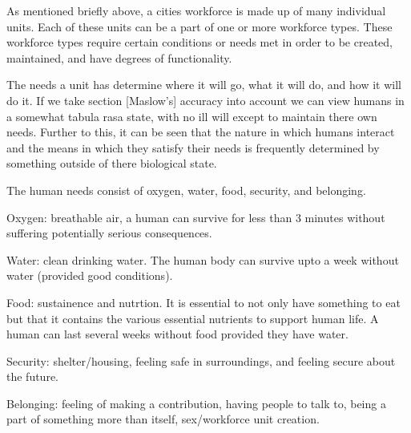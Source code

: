 





As mentioned briefly above, a cities workforce is made up of many individual units. Each of these units can be a part of one or more workforce types. These workforce types require certain conditions or needs met in order to be created, maintained, and have degrees of functionality. 

The needs a unit has determine where it will go, what it will do, and how it will do it. If we take section [Maslow's] accuracy into account we can view humans in a somewhat tabula rasa state, with no ill will except to maintain there own needs. Further to this, it can be seen that the nature in which humans interact and the means in which they satisfy their needs is frequently determined by something outside of there biological state. 

The human needs consist of oxygen, water, food, security, and belonging.



Oxygen: breathable air, a human can survive for less than 3 minutes without suffering potentially serious consequences. 

Water: clean drinking water. The human body can survive upto a week without water (provided good conditions). 

Food: sustainence and nutrtion. It is essential to not only have something to eat but that it contains the various essential nutrients to support human life. A human can last several weeks without food provided they have water.

Security: shelter/housing, feeling safe in surroundings, and feeling secure about the future.

Belonging: feeling of making a contribution, having people to talk to, being a part of something more than itself, sex/workforce unit creation.



